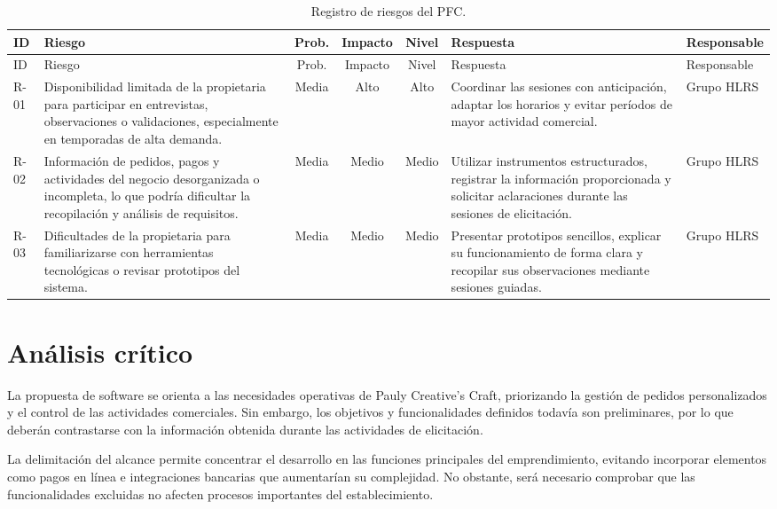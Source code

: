 \documentclass[11pt,a4paper]{article}
\begin{document}
	{\small
		\begin{xltabular}{\textwidth}{@{}lYcccYY@{}}
			\caption{Registro de riesgos del PFC.}\label{tab:riesgos}\\
			\toprule
			ID & Riesgo & Prob. & Impacto & Nivel & Respuesta & Responsable \\
			\midrule
			\endfirsthead
			\toprule
			ID & Riesgo & Prob. & Impacto & Nivel & Respuesta & Responsable \\
			\midrule
			\endhead
			\bottomrule
			\endfoot
			
			R-01 &
			Disponibilidad limitada de la propietaria para participar en entrevistas, observaciones o validaciones, especialmente en temporadas de alta demanda. &
			Media &
			Alto &
			Alto &
			Coordinar las sesiones con anticipación, adaptar los horarios y evitar períodos de mayor actividad comercial. &
			Grupo HLRS \\
			
			R-02 &
			Información de pedidos, pagos y actividades del negocio desorganizada o incompleta, lo que podría dificultar la recopilación y análisis de requisitos. &
			Media &
			Medio &
			Medio &
			Utilizar instrumentos estructurados, registrar la información proporcionada y solicitar aclaraciones durante las sesiones de elicitación. &
			Grupo HLRS \\
			
			R-03 &
			Dificultades de la propietaria para familiarizarse con herramientas tecnológicas o revisar prototipos del sistema. &
			Media &
			Medio &
			Medio &
			Presentar prototipos sencillos, explicar su funcionamiento de forma clara y recopilar sus observaciones mediante sesiones guiadas. &
			Grupo HLRS \\
		\end{xltabular}
	}
	
	
	\section{Análisis crítico}
	
	La propuesta de software se orienta a las necesidades operativas de Pauly Creative's Craft, priorizando la gestión de pedidos personalizados y el control de las actividades comerciales. Sin embargo, los objetivos y funcionalidades definidos todavía son preliminares, por lo que deberán contrastarse con la información obtenida durante las actividades de elicitación.
	
	La delimitación del alcance permite concentrar el desarrollo en las funciones principales del emprendimiento, evitando incorporar elementos como pagos en línea e integraciones bancarias que aumentarían su complejidad. No obstante, será necesario comprobar que las funcionalidades excluidas no afecten procesos importantes del establecimiento.
	
\end{document}
